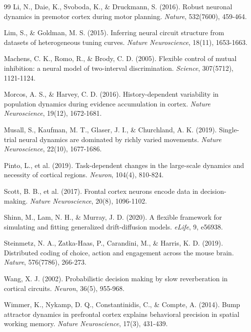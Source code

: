 \documentclass[11pt,a4paper]{article}
\begin{document}
\begin{thebibliography}{99}
Li, N., Daie, K., Svoboda, K., \& Druckmann, S. (2016). Robust neuronal dynamics in premotor cortex during motor planning. \textit{Nature}, 532(7600), 459-464.

Lim, S., \& Goldman, M. S. (2015). Inferring neural circuit structure from datasets of heterogeneous tuning curves. \textit{Nature Neuroscience}, 18(11), 1653-1663.

Machens, C. K., Romo, R., \& Brody, C. D. (2005). Flexible control of mutual inhibition: a neural model of two-interval discrimination. \textit{Science}, 307(5712), 1121-1124.

Morcos, A. S., \& Harvey, C. D. (2016). History-dependent variability in population dynamics during evidence accumulation in cortex. \textit{Nature Neuroscience}, 19(12), 1672-1681.

Musall, S., Kaufman, M. T., Glaser, J. I., \& Churchland, A. K. (2019). Single-trial neural dynamics are dominated by richly varied movements. \textit{Nature Neuroscience}, 22(10), 1677-1686.

Pinto, L., et al. (2019). Task-dependent changes in the large-scale dynamics and necessity of cortical regions. \textit{Neuron}, 104(4), 810-824.

Scott, B. B., et al. (2017). Frontal cortex neurons encode data in decision-making. \textit{Nature Neuroscience}, 20(8), 1096-1102.

Shinn, M., Lam, N. H., \& Murray, J. D. (2020). A flexible framework for simulating and fitting generalized drift-diffusion models. \textit{eLife}, 9, e56938.

Steinmetz, N. A., Zatka-Haas, P., Carandini, M., \& Harris, K. D. (2019). Distributed coding of choice, action and engagement across the mouse brain. \textit{Nature}, 576(7786), 266-273.

Wang, X. J. (2002). Probabilistic decision making by slow reverberation in cortical circuits. \textit{Neuron}, 36(5), 955-968.

Wimmer, K., Nykamp, D. Q., Constantinidis, C., \& Compte, A. (2014). Bump attractor dynamics in prefrontal cortex explains behavioral precision in spatial working memory. \textit{Nature Neuroscience}, 17(3), 431-439.


\end{thebibliography}
\end{document}
